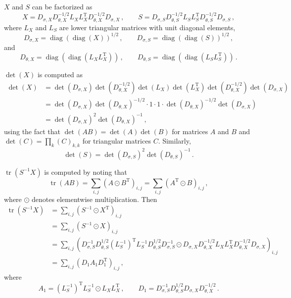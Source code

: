 \documentclass[12pt]{article}
\DeclareMathOperator{\tr}{tr}
\DeclareMathOperator{\diag}{diag}
\newcommand{\transpose}[1]{#1^{\mathrm{T}}}
\begin{document}
$X$ and $S$ can be factorized as
\begin{equation}
X = D_{\sigma,X} D_{\theta,X}^{-1/2} L_{X} \transpose{L_{X}} D_{\theta,X}^{-1/2} D_{\sigma,X}\,,\qquad S = D_{\sigma,S} D_{\theta,S}^{-1/2} L_{S} \transpose{L_{S}} D_{\theta,S}^{-1/2} D_{\sigma,S}\,,
\end{equation}
where $L_{X}$ and $L_{S}$ are lower triangular matrices
with unit diagonal elements,
\begin{equation}
D_{\sigma,X} = \diag(\diag(X))^{1/2}\,,\qquad D_{\sigma,S} = \diag(\diag(S))^{1/2}\,,
\end{equation}
and
\begin{equation}
D_{\theta,X} = \diag(\diag(L_{X} \transpose{L_{X}}))\,,\qquad D_{\theta,S} = \diag(\diag(L_{S} \transpose{L_{S}}))\,.
\end{equation}

$\det(X)$ is computed as
\begin{equation}
\begin{aligned}
\det(X)
  &= \det(D_{\sigma,X}) \det(D_{\theta,X}^{-1/2}) \det(L_{X}) \det(\transpose{L_{X}}) \det(D_{\theta,X}^{-1/2}) \det(D_{\sigma,X}) \\
  &= \det(D_{\sigma,X}) \det(D_{\theta,X})^{-1/2} \cdot 1 \cdot 1 \cdot \det(D_{\theta,X})^{-1/2} \det(D_{\sigma,X}) \\
  &= \det(D_{\sigma,X})^{2} \det(D_{\theta,X})^{-1}\,,
\end{aligned}
\end{equation}
using the fact that
$\det(A B) = \det(A) \det(B)$ for matrices $A$ and $B$
and
$\det(C) = \prod_{k} (C)_{k,k}$ for triangular matrices $C$.
Similarly,
\begin{equation}
\det(S) = \det(D_{\sigma,S})^{2} \det(D_{\theta,S})^{-1}\,.
\end{equation}

$\tr(S^{-1} X)$ is computed by noting that
\begin{equation}
\tr(A B) = \sum_{i,j} (A \odot \transpose{B})_{i,j} = \sum_{i,j} (\transpose{A} \odot B)_{i,j}\,,
\end{equation}
where $\odot$ denotes elementwise multiplication.
Then
\begin{equation}
\begin{aligned}
\tr(S^{-1} X)
  &= \sum_{i,j} (S^{-1} \odot \transpose{X})_{i,j} \\
  &= \sum_{i,j} (S^{-1} \odot X)_{i,j} \\
  &= \sum_{i,j} (D_{\sigma,S}^{-1} D_{\theta,S}^{1/2} \transpose{(L_{S}^{-1})} L_{S}^{-1} D_{\theta,S}^{1/2} D_{\sigma,S}^{-1} \odot D_{\sigma,X} D_{\theta,X}^{-1/2} L_{X} \transpose{L_{X}} D_{\theta,X}^{-1/2} D_{\sigma,X})_{i,j} \\
  &= \sum_{i,j} (D_{1} A_{1} \transpose{D_{1}})_{i,j}\,,
\end{aligned}
\end{equation}
where
\begin{equation}
A_{1} = \transpose{(L_{S}^{-1})} L_{S}^{-1} \odot L_{X} \transpose{L_{X}}\,,\qquad D_{1} = D_{\sigma,S}^{-1} D_{\theta,S}^{1/2} D_{\sigma,X} D_{\theta,X}^{-1/2}\,.
\end{equation}
\end{document}
